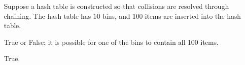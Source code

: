 \begin{prob}
    Suppose a hash table is constructed so that collisions are resolved through
    chaining. The hash table has $10$ bins, and 100 items are inserted into the
    hash table.

    True or False: it is possible for one of the bins to contain all 100 items.

    \Tf

    \begin{soln}
        True.
    \end{soln}

\end{prob}
